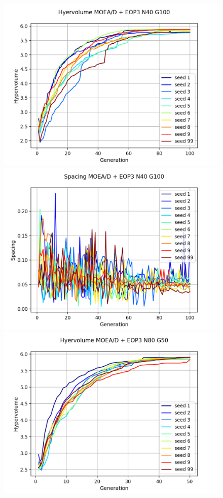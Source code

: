 \begin{figure}[H]
\centering
\includegraphics[scale=0.43]{figures/METRICS_EOP3/Hypervol_N40_G100.png} \quad 
\includegraphics[scale=0.43]{figures/METRICS_EOP3/Spacing_N40_G100.png}\\
\includegraphics[scale=0.43]{figures/METRICS_EOP3/Hypervol_N80_G50.png}\quad 

\end{figure}
